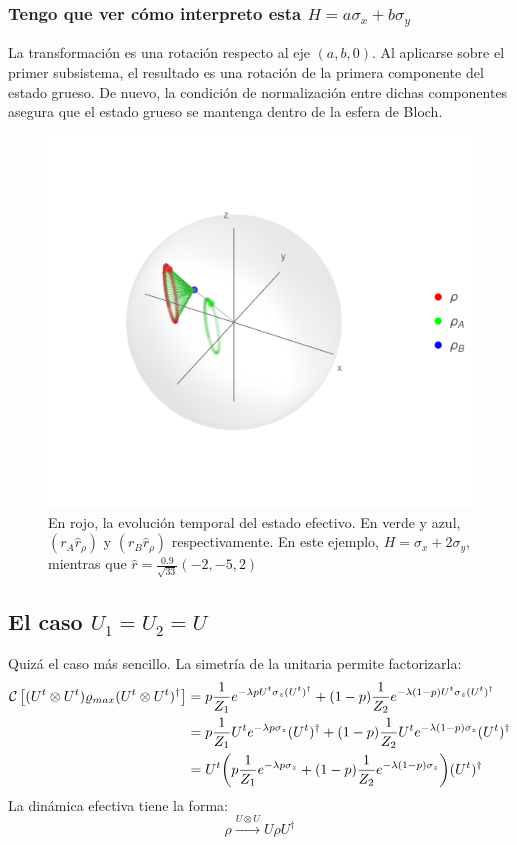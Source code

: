 \subsubsection{Tengo que ver cómo interpreto esta $H=a\sigma_{x}+b\sigma_{y}$}
La transformación es una rotación respecto al eje $(a,b,0)$. Al aplicarse sobre el primer subsistema, el resultado es una rotación de la primera componente del estado grueso. De nuevo, la condición de normalización entre dichas componentes asegura que el estado grueso se mantenga dentro de la esfera de Bloch. 
\begin{figure}[h!]
    \centering
    \includegraphics[width=0.6\linewidth]{maxent/figures/U1xU2_H1=sx+sy_H2=Id_z=0.9_p=0.4_sequence.png}
    \caption{En rojo, la evolución temporal del estado efectivo. En verde y azul, $(r_{A}\hat{r}_{\rho})$ y $(r_{B}\hat{r}_{\rho})$ respectivamente. En este ejemplo, $H=\sigma_{x}+2\sigma_{y}$, mientras que $\hat{r}=\frac{0.9}{\sqrt{33}}(-2,-5,2)$}
    \label{fig:XYRot}
\end{figure}

\subsection{El caso $U_{1}=U_{2}=U$}

Quizá el caso más sencillo. La simetría de la unitaria permite factorizarla:
\begin{align*}
\mathcal{C}\left[(U^{t}\otimes U^{t})\varrho_{max}(U^{t}\otimes U^{t})^{\dag}\right]&=p\frac{1}{Z_{1}}e^{-\lambda p U^{t}\sigma_{z}(U^t)^{\dag}}+(1-p)\frac{1}{Z_{2}}e^{-\lambda (1-p)U^{t}\sigma_{z}(U^t)^{\dag}}\\
&=p\frac{1}{Z_{1}}U^{t}e^{-\lambda p \sigma_{z}}(U^t)^{\dag}+(1-p)\frac{1}{Z_{2}}U^{t}e^{-\lambda (1-p)\sigma_{z}}(U^t)^{\dag}\\
&=U^{t}\qty(p\frac{1}{Z_{1}}e^{-\lambda p \sigma_{z}}+(1-p)\frac{1}{Z_{2}}e^{-\lambda (1-p)\sigma_{z}})(U^t)^{\dag}\\
\end{align*}
La dinámica efectiva tiene la forma:
\begin{equation}
    \rho\xrightarrow{U\otimes U}U\rho U^{\dagger}
\end{equation}


